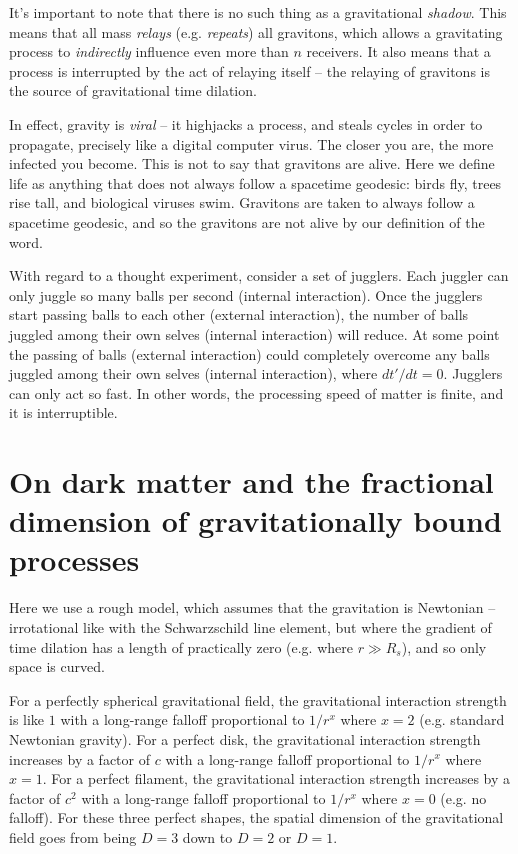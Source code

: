 \documentclass[12pt]{article}
\begin{document}
It's important to note that there is no such thing as a gravitational {\textit{shadow}}.
This means that all mass {\textit{relays}} (e.g. {\textit{repeats}}) all gravitons, which allows a gravitating process to {\textit{indirectly}} influence even more than $n$ receivers.
It also means that a process is interrupted by the act of relaying itself -- the relaying of gravitons is the source of gravitational time dilation.

In effect, gravity is {\textit{viral}} -- it highjacks a process, and steals cycles in order to propagate, precisely like a digital computer virus.
The closer you are, the more infected you become.
This is not to say that gravitons are alive.
Here we define life as anything that does not always follow a spacetime geodesic: birds fly, trees rise tall, and biological viruses swim.
Gravitons are taken to always follow a spacetime geodesic, and so the gravitons are not alive by our definition of the word.

With regard to a thought experiment, consider a set of jugglers.
Each juggler can only juggle so many balls per second (internal interaction).
Once the jugglers start passing balls to each other (external interaction), the number of balls juggled among their own selves (internal interaction) will reduce.
At some point the passing of balls (external interaction) could completely overcome any balls juggled among their own selves (internal interaction), where $dt'/dt = 0$.
Jugglers can only act so fast. 
In other words, the processing speed of matter is finite, and it is interruptible.




\section{On dark matter and the fractional dimension of gravitationally bound processes}

Here we use a rough model, which assumes that the gravitation is Newtonian -- irrotational like with the Schwarzschild line element, but where the gradient of time dilation has a length of practically zero (e.g. where $r \gg R_s$), and so only space is curved.

For a perfectly spherical gravitational field, the gravitational interaction strength is like $1$ with a long-range falloff proportional to $1/r^x$ where $x = 2$ (e.g. standard Newtonian gravity).
For a perfect disk, the gravitational interaction strength increases by a factor of $c$ with a long-range falloff proportional to $1/r^x$ where $x = 1$.
For a perfect filament, the gravitational interaction strength increases by a factor of $c^2$ with a long-range falloff proportional to $1/r^x$ where $x = 0$ (e.g. no falloff).
For these three perfect shapes, the spatial dimension of the gravitational field goes from being $D = 3$ down to $D = 2$ or $D = 1$.
\end{document}
